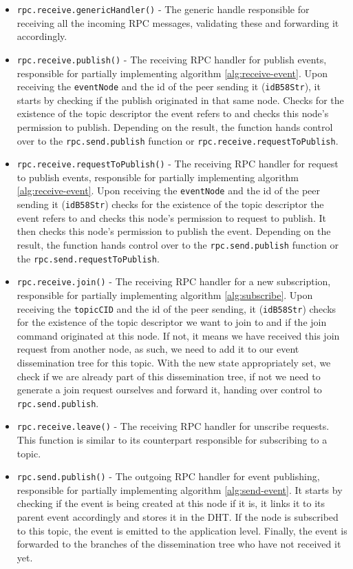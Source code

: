 \begin{itemize}
  \item
    \verb|rpc.receive.genericHandler()| - The generic handle responsible for receiving all the incoming RPC messages, validating these and forwarding it accordingly.
  \item
    \verb|rpc.receive.publish()| - The receiving RPC handler for publish events, responsible for partially implementing algorithm \ref{alg:receive-event}. Upon receiving the \verb|eventNode| and the id of the peer sending it (\verb|idB58Str|), it starts by checking if the publish originated in that same node. Checks for the existence of the topic descriptor the event refers to and checks this node's permission to publish. Depending on the result, the function hands control over to the \verb|rpc.send.publish| function or \verb|rpc.receive.requestToPublish|. 
  \item
    \verb|rpc.receive.requestToPublish()| - The receiving RPC handler for request to publish events, responsible for partially implementing algorithm \ref{alg:receive-event}. Upon receiving the \verb|eventNode| and the id of the peer sending it (\verb|idB58Str|) checks for the existence of the topic descriptor the event refers to and checks this node's permission to request to publish. It then checks this node's permission to publish the event. Depending on the result, the function hands control over to the \verb|rpc.send.publish| function or the \verb|rpc.send.requestToPublish|. 
  \item
    \verb|rpc.receive.join()| - The receiving RPC handler for a new subscription, responsible for partially implementing algorithm \ref{alg:subscribe}. Upon receiving the \verb|topicCID| and the id of the peer sending, it (\verb|idB58Str|) checks for the existence of the topic descriptor we want to join to and if the join command originated at this node. If not, it means we have received this join request from another node, as such, we need to add it to our event dissemination tree for this topic. With the new state appropriately set, we check if we are already part of this dissemination tree, if not we need to generate a join request ourselves and forward it, handing over control to \verb|rpc.send.publish|. 
  \item
    \verb|rpc.receive.leave()| - The receiving RPC handler for unscribe requests. This function is similar to its counterpart responsible for subscribing to a topic.
  \item
    \verb|rpc.send.publish()| - The outgoing RPC handler for event publishing, responsible for partially implementing algorithm \ref{alg:send-event}. It starts by checking if the event is being created at this node if it is, it links it to its parent event accordingly and stores it in the DHT. If the node is subscribed to this topic, the event is emitted to the application level. Finally, the event is forwarded to the branches of the dissemination tree who have not received it yet.

\end{itemize}
